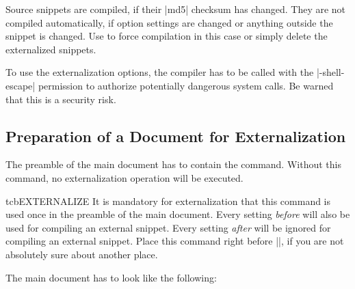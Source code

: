 \begin{marker}
Source snippets are compiled, if their |md5| checksum has changed.
They are not compiled automatically, if option settings are changed or
anything outside the snippet is changed.
Use  to force compilation in this case
or simply delete the externalized snippets.
\end{marker}

\begin{marker}
To use the externalization options, the compiler has to be called with the
|-shell-escape| permission to authorize potentially dangerous system calls.
Be warned that this is a security risk.
\end{marker}


\clearpage
\subsection{Preparation of a Document for Externalization}\label{subsec:external_preparation}

The preamble of the main document has to contain the 
command. Without this command, no externalization operation will be
executed.

\begin{docCommand}[doc new=2015-03-11]{tcbEXTERNALIZE}{}
  It is mandatory for externalization that this command is used once
  in the preamble of the main document. Every setting \emph{before}
   will also be used for compiling an external
  snippet. Every setting \emph{after}  will be
  ignored for compiling an external snippet.
  Place this command right before ||, if you are not
  absolutely sure about another place.

  The main document has to look like the following:

\end{docCommand}

